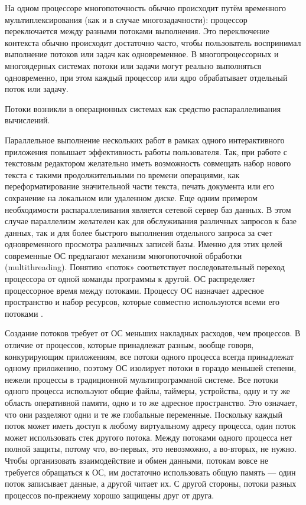 \documentclass[a4paper,12pt]{report}
\begin{document}
На одном процессоре многопоточность обычно происходит путём временного мультиплексирования (как и в случае многозадачности): процессор переключается между разными потоками выполнения. Это переключение контекста обычно происходит достаточно часто, чтобы пользователь воспринимал выполнение потоков или задач как одновременное. В многопроцессорных и многоядерных системах потоки или задачи могут реально выполняться одновременно, при этом каждый процессор или ядро обрабатывает отдельный поток или задачу.

Потоки возникли в операционных системах как средство распараллеливания вычислений.

Параллельное выполнение нескольких работ в рамках одного интерактивного приложения повышает эффективность работы пользователя. Так, при работе с текстовым редактором желательно иметь возможность совмещать набор нового текста с такими продолжительными по времени операциями, как переформатирование значительной части текста, печать документа или его сохранение на локальном или удаленном диске. Еще одним примером необходимости распараллеливания является сетевой сервер баз данных. В этом случае параллелизм желателен как для обслуживания различных запросов к базе данных, так и для более быстрого выполнения отдельного запроса за счет одновременного просмотра различных записей базы. Именно для этих целей современные ОС предлагают механизм многопоточной обработки (multithreading). Понятию «поток» соответствует последовательный переход процессора от одной команды программы к другой. ОС распределяет процессорное время между потоками. Процессу ОС назначает адресное пространство и набор ресурсов, которые совместно используются всеми его потоками \cite{multithreading_history}.

Создание потоков требует от ОС меньших накладных расходов, чем процессов. В отличие от процессов, которые принадлежат разным, вообще говоря, конкурирующим приложениям, все потоки одного процесса всегда принадлежат одному приложению, поэтому ОС изолирует потоки в гораздо меньшей степени, нежели процессы в традиционной мультипрограммной системе. Все потоки одного процесса используют общие файлы, таймеры, устройства, одну и ту же область оперативной памяти, одно и то же адресное пространство. Это означает, что они разделяют одни и те же глобальные переменные. Поскольку каждый поток может иметь доступ к любому виртуальному адресу процесса, один поток может использовать стек другого потока. Между потоками одного процесса нет полной защиты, потому что, во-первых, это невозможно, а во-вторых, не нужно. Чтобы организовать взаимодействие и обмен данными, потокам вовсе не требуется обращаться к ОС, им достаточно использовать общую память — один поток записывает данные, а другой читает их. С другой стороны, потоки разных процессов по-прежнему хорошо защищены друг от друга.
\end{document}
